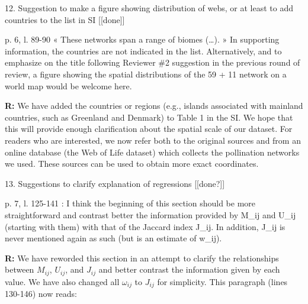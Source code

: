 \documentclass[12pt]{letter}
\newenvironment{refquote}{\bigskip \begin{it}}{\end{it}\smallskip}
\begin{document}
	12. Suggestion to make a figure showing distribution of webs, or at least to add countries to the list in SI [[done]]

		\begin{refquote}
			p. 6, l. 89-90 « These networks span a range of biomes (…). » In supporting information, the countries are not indicated in the list. Alternatively, and to emphasize on the title following Reviewer \#2 suggestion in the previous round of review, a figure showing the spatial distributions of the 59 + 11 network on a world map would be welcome here.
		\end{refquote}


		\textbf{R:} We have added the countries or regions (e.g., islands associated with mainland countries, such as Greenland and Denmark) to Table 1 in the SI. We hope that this will provide enough clarification about the spatial scale of our dataset. For readers who are interested, we now refer both to the original sources and from an online database (the Web of Life dataset) which collects the pollination networks we used. These sources can be used to obtain more exact coordinates. 


	13. Suggestions to clarify explanation of regressions [[done?]]

		\begin{refquote}
			p. 7, l. 125-141 : I think the beginning of this section should be more straightforward and contrast better the information provided by M\_ij and U\_ij (starting with them) with that of the Jaccard index J\_ij. In addition, J\_ij is never mentioned again as such (but is an estimate of w\_ij).
		\end{refquote}


		\textbf{R:} We have reworded this section in an attempt to clarify the relationships between $M_{ij}$, $U_{ij}$, and $J_{ij}$ and better contrast the information given by each value. We have also changed all $\omega_{ij}$ to $J_{ij}$ for simplicity. This paragraph (lines 130-146) now reads:
\end{document}
